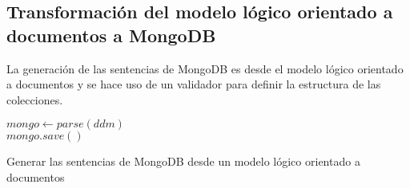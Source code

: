 \subsection{Transformación del modelo lógico orientado a documentos a MongoDB}
La generación de las sentencias de MongoDB es desde el modelo lógico orientado a documentos y se hace uso de un validador para definir la estructura de las colecciones.


\begin{algorithm}[H]
  
        $mongo \gets parse(ddm)$\\
        $mongo.save()$
    \caption{Generar las sentencias de MongoDB desde un modelo lógico orientado a documentos}
  \end{algorithm}


